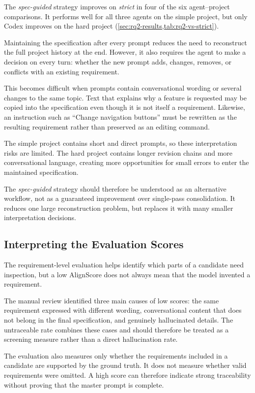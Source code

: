 The \emph{spec-guided} strategy improves on \emph{strict} in four of the six
agent--project comparisons. It performs well for all three agents on the
simple project, but only Codex improves on the hard project
(\cref{sec:rq2-results,tab:rq2-vs-strict}).

Maintaining the specification after every prompt reduces the need to
reconstruct the full project history at the end. However, it also requires the
agent to make a decision on every turn: whether the new prompt adds, changes,
removes, or conflicts with an existing requirement.

This becomes difficult when prompts contain conversational wording or several
changes to the same topic. Text that explains why a feature is requested may
be copied into the specification even though it is not itself a requirement.
Likewise, an instruction such as ``Change navigation buttons'' must be
rewritten as the resulting requirement rather than preserved as an editing
command.

The simple project contains short and direct prompts, so these interpretation
risks are limited. The hard project contains longer revision chains and more
conversational language, creating more opportunities for small errors to enter
the maintained specification.

The \emph{spec-guided} strategy should therefore be understood as an
alternative workflow, not as a guaranteed improvement over single-pass
consolidation. It reduces one large reconstruction problem, but replaces it
with many smaller interpretation decisions.

\subsection{Interpreting the Evaluation Scores}

The requirement-level evaluation helps identify which parts of a candidate
need inspection, but a low AlignScore does not always mean that the model
invented a requirement.

The manual review identified three main causes of low scores: the same
requirement expressed with different wording, conversational content that does
not belong in the final specification, and genuinely hallucinated details.
The untraceable rate combines these cases and should therefore be treated as a
screening measure rather than a direct hallucination rate.

The evaluation also measures only whether the requirements included in a
candidate are supported by the ground truth. It does not measure whether valid
requirements were omitted. A high score can therefore indicate strong
traceability without proving that the master prompt is complete.

